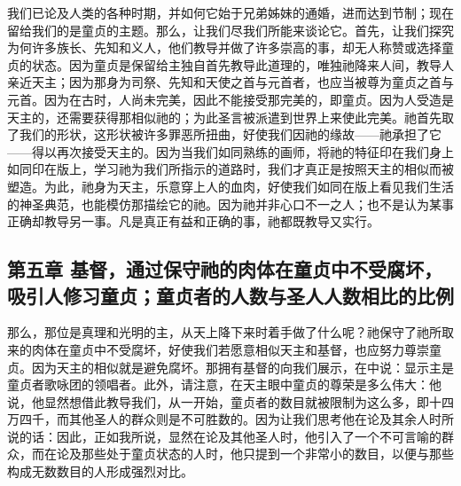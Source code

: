 我们已论及人类的各种时期，并如何它始于兄弟姊妹的通婚，进而达到节制；现在留给我们的是童贞的主题。那么，让我们尽我们所能来谈论它。首先，让我们探究为何许多族长、先知和义人，他们教导并做了许多崇高的事，却无人称赞或选择童贞的状态。因为童贞是保留给主独自首先教导此道理的，唯独祂降来人间，教导人亲近天主；因为那身为司祭、先知和天使之首与元首者，也应当被尊为童贞之首与元首。因为在古时，人尚未完美，因此不能接受那完美的，即童贞。因为人受造是天主的，还需要获得那相似祂的；为此圣言被派遣到世界上来使此完美。祂首先取了我们的形状，这形状被许多罪恶所扭曲，好使我们因祂的缘故——祂承担了它——得以再次接受天主的。因为当我们如同熟练的画师，将祂的特征印在我们身上如同印在版上，学习祂为我们所指示的道路时，我们才真正是按照天主的相似而被塑造。为此，祂身为天主，乐意穿上人的血肉，好使我们如同在版上看见我们生活的神圣典范，也能模仿那描绘它的祂。因为祂并非心口不一之人；也不是认为某事正确却教导另一事。凡是真正有益和正确的事，祂都既教导又实行。\par


\subsection{第五章 基督，通过保守祂的肉体在童贞中不受腐坏，吸引人修习童贞；童贞者的人数与圣人人数相比的比例}

那么，那位是真理和光明的主，从天上降下来时着手做了什么呢？祂保守了祂所取来的肉体在童贞中不受腐坏，好使我们若愿意相似天主和基督，也应努力尊崇童贞。因为天主的相似就是避免腐坏。那拥有基督的向我们展示，在中说：显示主是童贞者歌咏团的领唱者。此外，请注意，在天主眼中童贞的尊荣是多么伟大：他说，他显然想借此教导我们，从一开始，童贞者的数目就被限制为这么多，即十四万四千，而其他圣人的群众则是不可胜数的。因为让我们思考他在论及其余人时所说的话：因此，正如我所说，显然在论及其他圣人时，他引入了一个不可言喻的群众，而在论及那些处于童贞状态的人时，他只提到一个非常小的数目，以便与那些构成无数数目的人形成强烈对比。\par

